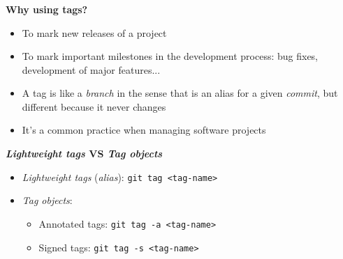\begin{frame}
  \frametitle{\insertsubsection}

  \textbf{Why using tags?}
  \begin{itemize}
  \item To mark new releases of a project\\
    \vspacing
  \item To mark important milestones in the development process:
    bug fixes, development of major features...\\
    \vspacing
  \item A tag is like a \textit{branch} in the sense that is an alias
    for a given \textit{commit}, but different because it never changes\\
    \vspacing
  \item It's a common practice when managing software projects\\
    \vspacing
  \end{itemize}

  \textbf{\textit{Lightweight tags} VS \textit{Tag objects}}
  \begin{itemize}
  \item \textit{Lightweight tags} (\textit{alias}): \texttt{git tag <tag-name>}\\
    \vspacing
  \item \textit{Tag objects}:
    \begin{itemize}
    \item Annotated tags: \texttt{git tag -a <tag-name>}\\
      \vspacing
    \item Signed tags: \texttt{git tag -s <tag-name>}\\
      \vspacing
    \end{itemize}
  \end{itemize}

\end{frame}

